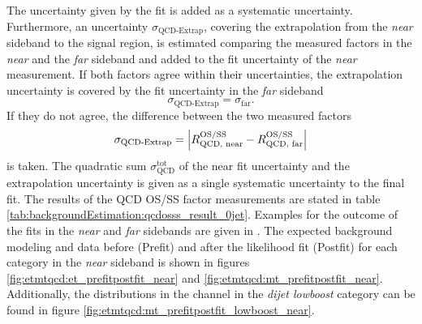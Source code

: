 The uncertainty given by the fit is added as a systematic uncertainty. Furthermore, an uncertainty $\sigma_{\text{QCD-Extrap}}$, covering the extrapolation from the \textit{near} sideband to the signal
region, is estimated comparing the measured factors in the \textit{near} and the \textit{far} sideband and added to the fit uncertainty of the \textit{near} measurement. 
If both factors agree within their uncertainties, the extrapolation uncertainty is covered by the fit uncertainty in the \textit{far} sideband
\begin{equation}
    \sigma_{\text{QCD-Extrap}} =  \sigma_{\text{far}}.
\end{equation}
If they do not agree, the difference between the two measured factors
\begin{equation}
    \sigma_{\text{QCD-Extrap}} =  \left| R_{\text{QCD, near}}^\text{OS/SS} - R_{\text{QCD, far}}^\text{OS/SS}  \right|
\end{equation}
is taken.
The quadratic sum $\sigma_\text{QCD}^\text{tot}$ of the near fit uncertainty and the  extrapolation uncertainty is given as a single systematic uncertainty to the final fit.
The results of the QCD OS/SS factor measurements are stated in table \ref{tab:backgroundEstimation:qcdosss_result_0jet}.
Examples for the outcome of the fits in the \textit{near} and \textit{far} sidebands are given in .
The expected background modeling and data before (Prefit) and after the likelihood fit (Postfit) for each category in the \textit{near} sideband is shown in figures \ref{fig:etmtqcd:et_prefitpostfit_near} and \ref{fig:etmtqcd:mt_prefitpostfit_near}. Additionally, the distributions in the \mutau{} channel in the \textit{dijet lowboost} category can be found
in figure \ref{fig:etmtqcd:mt_prefitpostfit_lowboost_near}.
